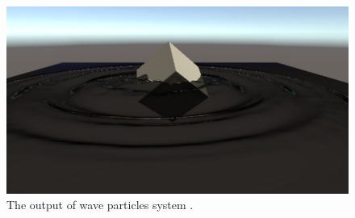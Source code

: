 \documentclass[a4paper,12pt,twoside,openright]{report}
\begin{document}

\begin{figure}[h]
\centering
\includegraphics[width=0.8\linewidth]{waveparticles_example}
\caption{The output of wave particles system \cite{WaveParticlesGPU}.}
\label{fig:waveparticles_example}
\end{figure}
\end{document}
